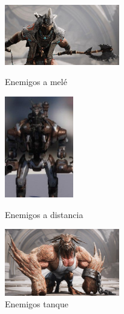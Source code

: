 \begin{itemize}
\begin{figure}[H]
  \begin{minipage}{0.33\textwidth}
    \centering
    \includegraphics[width=5cm]{./images/guerrero.jpg}
    \caption{Enemigos a melé}
    \label{Mele}
  \end{minipage}%
  \hspace{0.5mm}
  \begin{minipage}{0.33\textwidth}
    \centering
    \includegraphics[width=3cm]{./images/distancia.jpg}
    \caption{Enemigos a distancia}
    \label{Distancia}
  \end{minipage}
  \hspace{0.5mm}
  \begin{minipage}{0.33\textwidth}
    \centering
    \includegraphics[width=5cm]{./images/tanque.jpg}
    \caption{Enemigos tanque}
    \label{Tanque}
  \end{minipage}
\end{figure}


\end{itemize}
